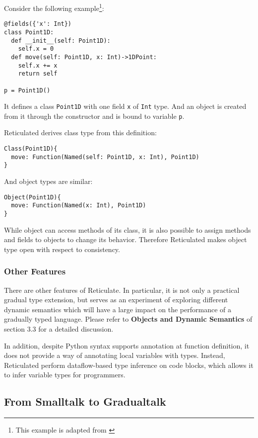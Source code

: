 Consider the following example\footnote{This example is adapted from \cite{vitousek2014design}}:

\begin{verbatim}
@fields({'x': Int})
class Point1D:
  def __init__(self: Point1D):
    self.x = 0
  def move(self: Point1D, x: Int)->1DPoint:
    self.x += x
    return self

p = Point1D()
\end{verbatim}

It defines a class \texttt{Point1D} with one field \texttt{x} of \texttt{Int} type.
And an object is created from it through the constructor
and is bound to variable \texttt{p}.

Reticulated derives class type from this definition:

\begin{verbatim}
Class(Point1D){
  move: Function(Named(self: Point1D, x: Int), Point1D)
}
\end{verbatim}

And object types are similar:

\begin{verbatim}
Object(Point1D){
  move: Function(Named(x: Int), Point1D)
}
\end{verbatim}

While object can access methods of its class, it is also possible
to assign methods and fields to objects to change its behavior.
Therefore Reticulated makes object type open with respect to consistency.

\subsubsection{Other Features}

There are other features of Reticulate.
In particular, it is not only a practical gradual type extension,
but serves as an experiment of exploring
different dynamic semantics which will have a large impact on
the performance of a gradually typed language.
Please refer to \textbf{Objects and Dynamic Semantics} of section
3.3 for a detailed discussion.

In addition, despite Python syntax supports annotation at function definition,
it does not provide a way of annotating local variables with types.
Instead, Reticulated perform dataflow-based type inference on code blocks, which allows it to infer variable types for programmers.

\subsection{From Smalltalk to Gradualtalk}

